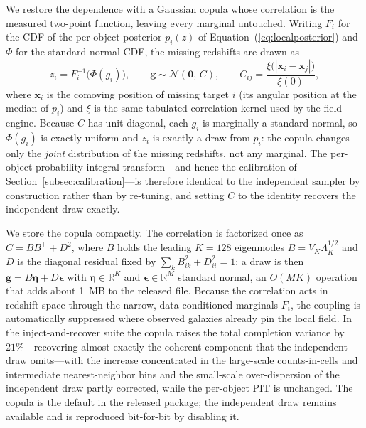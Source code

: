 \documentclass[apj]{emulateapj}
\begin{document}
We restore the dependence with a Gaussian copula whose correlation is the measured
two-point function, leaving every marginal untouched.  Writing $F_i$ for the CDF of
the per-object posterior $p_i(z)$ of Equation~(\ref{eq:localposterior}) and $\Phi$
for the standard normal CDF, the missing redshifts are drawn as
\begin{equation}
z_i = F_i^{-1}\!\big(\Phi(g_i)\big), \qquad
\mathbf{g}\sim\mathcal{N}(\mathbf{0},\,C), \qquad
C_{ij} = \frac{\xi\big(|\mathbf{x}_i-\mathbf{x}_j|\big)}{\xi(0)},
\label{eq:copula}
\end{equation}
where $\mathbf{x}_i$ is the comoving position of missing target $i$ (its angular
position at the median of $p_i$) and $\xi$ is the same tabulated correlation kernel
used by the field engine.  Because $C$ has unit diagonal, each $g_i$ is marginally
a standard normal, so $\Phi(g_i)$ is exactly uniform and $z_i$ is exactly a draw
from $p_i$: the copula changes only the \emph{joint} distribution of the missing
redshifts, not any marginal.  The per-object probability-integral transform---and
hence the calibration of Section~\ref{subsec:calibration}---is therefore identical
to the independent sampler by construction rather than by re-tuning, and setting
$C$ to the identity recovers the independent draw exactly.

We store the copula compactly.  The correlation is factorized once as
$C = BB^{\!\top} + D^2$, where $B$ holds the leading $K=128$ eigenmodes
$B=V_K\Lambda_K^{1/2}$ and $D$ is the diagonal residual fixed by
$\sum_k B_{ik}^2 + D_{ii}^2 = 1$; a draw is then
$\mathbf{g}=B\boldsymbol{\eta}+D\boldsymbol{\epsilon}$ with
$\boldsymbol{\eta}\in\mathbb{R}^{K}$ and $\boldsymbol{\epsilon}\in\mathbb{R}^{M}$
standard normal, an $O(MK)$ operation that adds about 1~MB to the released file.
Because the correlation acts in redshift space through the narrow, data-conditioned
marginals $F_i$, the coupling is automatically suppressed where observed galaxies
already pin the local field.  In the inject-and-recover suite the copula raises the
total completion variance by $21\%$---recovering almost exactly the coherent
component that the independent draw omits---with the increase concentrated in the
large-scale counts-in-cells and intermediate nearest-neighbor bins and the
small-scale over-dispersion of the independent draw partly corrected, while the
per-object PIT is unchanged.  The copula is the default in the released package;
the independent draw remains available and is reproduced bit-for-bit by disabling
it.
\end{document}
